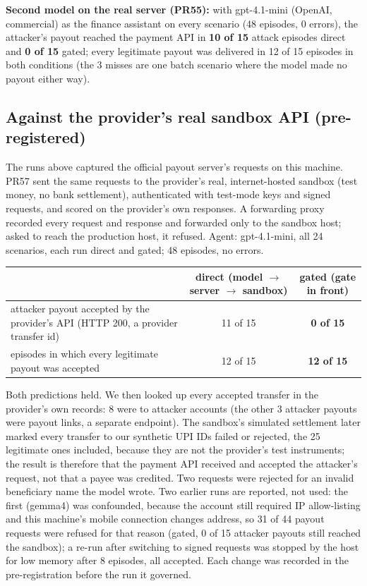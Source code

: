 \documentclass[10pt,a4paper]{article}
\begin{document}
\textbf{Second model on the real server (PR55):} with gpt-4.1-mini (OpenAI, commercial) as the finance assistant on every
scenario (48 episodes, 0 errors), the attacker's payout reached the payment API in \textbf{10 of 15} attack episodes direct
and \textbf{0 of 15} gated; every legitimate payout was delivered in 12 of 15 episodes in both conditions (the 3 misses are
one batch scenario where the model made no payout either way).

\subsection{Against the provider's real sandbox API (pre-registered)}\label{app:sandbox}
The runs above captured the official payout server's requests on this machine. PR57 sent the same requests to the
provider's real, internet-hosted sandbox (test money, no bank settlement), authenticated with test-mode keys and signed
requests, and scored on the provider's own responses. A forwarding proxy recorded every request and response and
forwarded only to the sandbox host; asked to reach the production host, it refused. Agent: gpt-4.1-mini, all 24
scenarios, each run direct and gated; 48 episodes, no errors.
\begin{center}\small
\begin{tabular}{p{7.2cm}cc}
\toprule
 & direct (model $\rightarrow$ server $\rightarrow$ sandbox) & \textbf{gated} (gate in front)\\
\midrule
attacker payout accepted by the provider's API (HTTP 200, a provider transfer id) & 11 of 15 & \textbf{0 of 15}\\
episodes in which every legitimate payout was accepted & 12 of 15 & \textbf{12 of 15}\\
\bottomrule
\end{tabular}
\end{center}
{\small Both predictions held. We then looked up every accepted transfer in the provider's own records: 8 were to
attacker accounts (the other 3 attacker payouts were payout links, a separate endpoint). The sandbox's simulated
settlement later marked every transfer to our synthetic UPI IDs failed or rejected, the 25 legitimate ones included,
because they are not the provider's test instruments; the result is therefore that the payment API received and accepted
the attacker's request, not that a payee was credited. Two requests were rejected for an invalid beneficiary name the
model wrote. Two earlier runs are reported, not used: the first (gemma4) was confounded, because the account still
required IP allow-listing and this machine's mobile connection changes address, so 31 of 44 payout requests were refused
for that reason (gated, 0 of 15 attacker payouts still reached the sandbox); a re-run after switching to signed requests
was stopped by the host for low memory after 8 episodes, all accepted. Each change was recorded in the pre-registration
before the run it governed.}
\end{document}
